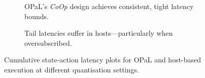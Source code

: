 \documentclass[
sigconf,natbib=false
]{acmart}
\newcommand{\approachshort}{OPaL}
\newcommand{\Coopfw}{\emph{CoOp}}
\begin{document}
\begin{figure}
	\centering
	\begin{subfigure}{0.45\linewidth}
		\caption{\approachshort's \Coopfw{} design achieves consistent, tight latency bounds.}
	\end{subfigure}
	\hspace{0.05\linewidth}
	\begin{subfigure}{0.45\linewidth}
		\caption{Tail latencies suffer in hosts---particularly when oversubscribed.}
	\end{subfigure}
	\caption{Cumulative state-action latency plots for \approachshort{} and host-based execution at different quantisation settings.\label{fig:lat-cumul}}
\end{figure}
\end{document}
